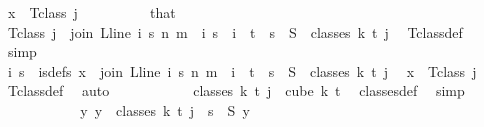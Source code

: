\begin{isabellebody}
\ {\isachardoublequoteopen}x\ {\isasymin}\ T{\isacharunderscore}{\kern0pt}class\ j{\isachardoublequoteclose}\isanewline
\ \ \ \ \ \ \ \ \isamarkupfalse%
\ that\ \isamarkupfalse%
\ {\isachardoublequoteopen}T{\isacharunderscore}{\kern0pt}class\ j\ {\isacharequal}{\kern0pt}\ {\isacharbraceleft}{\kern0pt}join\ {\isacharparenleft}{\kern0pt}L{\isacharunderscore}{\kern0pt}line\ i{\isacharparenright}{\kern0pt}\ s\ n\ m\ {\isacharbar}{\kern0pt}\ i\ s\ {\isachardot}{\kern0pt}\ i\ {\isasymin}\ {\isacharbraceleft}{\kern0pt}{\isachardot}{\kern0pt}{\isachardot}{\kern0pt}{\isacharless}{\kern0pt}t{\isacharbraceright}{\kern0pt}\ {\isasymand}\ s\ {\isasymin}\ S\ {\isacharbackquote}{\kern0pt}\ {\isacharparenleft}{\kern0pt}classes\ k\ t\ j{\isacharparenright}{\kern0pt}{\isacharbraceright}{\kern0pt}{\isachardoublequoteclose}\ \isamarkupfalse%
\ T{\isacharunderscore}{\kern0pt}class{\isacharunderscore}{\kern0pt}def\ \isamarkupfalse%
\ simp\isanewline
\ \ \ \ \ \ \ \ \isamarkupfalse%
\ \isamarkupfalse%
\ i\ s\ \ is{\isacharunderscore}{\kern0pt}defs{\isacharcolon}{\kern0pt}\ {\isachardoublequoteopen}x\ {\isacharequal}{\kern0pt}\ join\ {\isacharparenleft}{\kern0pt}L{\isacharunderscore}{\kern0pt}line\ i{\isacharparenright}{\kern0pt}\ s\ n\ m\ {\isasymand}\ i\ {\isacharless}{\kern0pt}\ t\ {\isasymand}\ s\ {\isasymin}\ S\ {\isacharbackquote}{\kern0pt}\ {\isacharparenleft}{\kern0pt}classes\ k\ t\ j{\isacharparenright}{\kern0pt}{\isachardoublequoteclose}\ \isamarkupfalse%
\ {\isacartoucheopen}x\ {\isasymin}\ T{\isacharunderscore}{\kern0pt}class\ j{\isacartoucheclose}\ \isamarkupfalse%
\ T{\isacharunderscore}{\kern0pt}class{\isacharunderscore}{\kern0pt}def\ \isamarkupfalse%
\ auto\isanewline
\ \ \ \ \ \ \ \ \isamarkupfalse%
\ \isamarkupfalse%
\ {\isacharasterisk}{\kern0pt}{\isacharcolon}{\kern0pt}{\isachardoublequoteopen}classes\ k\ t\ j\ {\isasymsubseteq}\ cube\ k\ {\isacharparenleft}{\kern0pt}t{\isacharplus}{\kern0pt}{}{\isacharparenright}{\kern0pt}{\isachardoublequoteclose}\ \isamarkupfalse%
\ classes{\isacharunderscore}{\kern0pt}def\ \isamarkupfalse%
\ simp\isanewline
\ \ \ \ \ \ \ \ \isamarkupfalse%
\ \isamarkupfalse%
\ {\isachardoublequoteopen}{\isasymexists}{\isacharbang}{\kern0pt}y{\isachardot}{\kern0pt}\ y\ {\isasymin}\ classes\ k\ t\ j\ {\isasymand}\ s\ {\isacharequal}{\kern0pt}\ S\ y{\isachardoublequoteclose}\ \isamarkupfalse%

\end{isabellebody}
